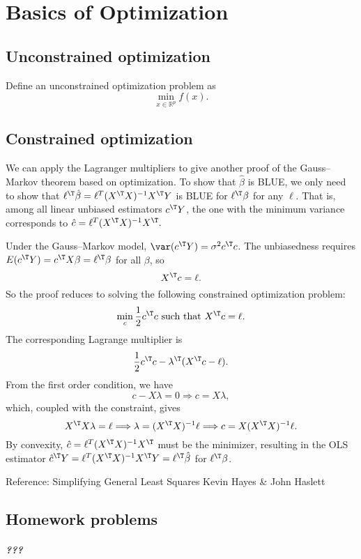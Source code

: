  
\chapter{Basics of Optimization}
\label{chapter::optimization} 





\section{Unconstrained optimization}


Define an unconstrained optimization problem as
$$
\min_{x\in \mathbb{R}^p} f(x).
$$



\section{Constrained optimization}



  
  We can apply the Lagranger multipliers to give another proof of the Gauss--Markov theorem based on optimization. To show that $\hat{\beta}$ is BLUE, we only need to show that $\ell^{\T} \hat\beta = \ell^{T}(X^{\T}X)^{-1}X^{\T}Y$ is BLUE for $\ell^{\T}\beta$ for any $\ell$. That is, among all linear unbiased estimators $c^{\T}Y$, the one with the minimum variance corresponds to $\hat{c} = \ell^{T}(X^{\T}X)^{-1}X^{\T}. $

Under the Gauss--Markov model, $\var(c^{\T}Y) = \sigma^2 c^{\T} c$. The unbiasedness requires
$
E( c^{\T}Y ) = c^{\T} X\beta  = \ell^{\T} \beta
$
for all $\beta$, so 
$$
 X^{\T} c = \ell.
$$
So the proof reduces to solving the following constrained optimization problem:
$$
\min_c   \frac{1}{2} c^{\T} c \text{ such that }  X^{\T} c = \ell.
$$
The corresponding Lagrange multiplier is
$$
  \frac{1}{2}  c^{\T}c-\lambda^{\T}(X^{\T}c-\ell) .
$$
From the first order condition, we have 
$$
c-X\lambda=0 \Longrightarrow   c=X\lambda ,
$$
which, coupled with the constraint, gives
$$
X^{\T}X\lambda=\ell  \Longrightarrow   \lambda = (X^{\T}X)^{-1}\ell \Longrightarrow   c=X(X^{\T}X)^{-1}\ell.
$$
By convexity, $\hat{c} = \ell^{T}(X^{\T}X)^{-1}X^{\T}$ must be the minimizer, resulting in the OLS estimator $ \hat{c}^{\T} Y =  \ell^{T}(X^{\T}X)^{-1}X^{\T}Y=\ell^{\T}\hat{\beta}$ for $\ell^{\T}\beta$. 



Reference: Simplifying General Least Squares Kevin Hayes \& John Haslett



\section{Homework problems}


\paragraph{???}\label{hw-math5::??}

 
